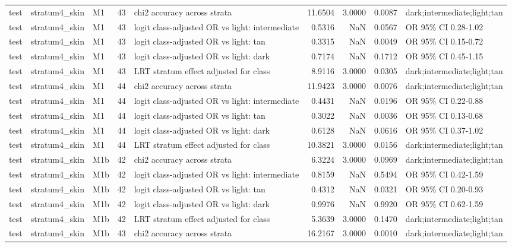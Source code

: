 \begin{tabular}{lllrlrrrl}
test & stratum4\_skin & M1 & 43 & chi2 accuracy across strata & 11.6504 & 3.0000 & 0.0087 & dark;intermediate;light;tan \\
test & stratum4\_skin & M1 & 43 & logit class-adjusted OR vs light: intermediate & 0.5316 & NaN & 0.0567 & OR 95\% CI 0.28-1.02 \\
test & stratum4\_skin & M1 & 43 & logit class-adjusted OR vs light: tan & 0.3315 & NaN & 0.0049 & OR 95\% CI 0.15-0.72 \\
test & stratum4\_skin & M1 & 43 & logit class-adjusted OR vs light: dark & 0.7174 & NaN & 0.1712 & OR 95\% CI 0.45-1.15 \\
test & stratum4\_skin & M1 & 43 & LRT stratum effect adjusted for class & 8.9116 & 3.0000 & 0.0305 & dark;intermediate;light;tan \\
test & stratum4\_skin & M1 & 44 & chi2 accuracy across strata & 11.9423 & 3.0000 & 0.0076 & dark;intermediate;light;tan \\
test & stratum4\_skin & M1 & 44 & logit class-adjusted OR vs light: intermediate & 0.4431 & NaN & 0.0196 & OR 95\% CI 0.22-0.88 \\
test & stratum4\_skin & M1 & 44 & logit class-adjusted OR vs light: tan & 0.3022 & NaN & 0.0036 & OR 95\% CI 0.13-0.68 \\
test & stratum4\_skin & M1 & 44 & logit class-adjusted OR vs light: dark & 0.6128 & NaN & 0.0616 & OR 95\% CI 0.37-1.02 \\
test & stratum4\_skin & M1 & 44 & LRT stratum effect adjusted for class & 10.3821 & 3.0000 & 0.0156 & dark;intermediate;light;tan \\
test & stratum4\_skin & M1b & 42 & chi2 accuracy across strata & 6.3224 & 3.0000 & 0.0969 & dark;intermediate;light;tan \\
test & stratum4\_skin & M1b & 42 & logit class-adjusted OR vs light: intermediate & 0.8159 & NaN & 0.5494 & OR 95\% CI 0.42-1.59 \\
test & stratum4\_skin & M1b & 42 & logit class-adjusted OR vs light: tan & 0.4312 & NaN & 0.0321 & OR 95\% CI 0.20-0.93 \\
test & stratum4\_skin & M1b & 42 & logit class-adjusted OR vs light: dark & 0.9976 & NaN & 0.9920 & OR 95\% CI 0.62-1.59 \\
test & stratum4\_skin & M1b & 42 & LRT stratum effect adjusted for class & 5.3639 & 3.0000 & 0.1470 & dark;intermediate;light;tan \\
test & stratum4\_skin & M1b & 43 & chi2 accuracy across strata & 16.2167 & 3.0000 & 0.0010 & dark;intermediate;light;tan \\

\end{tabular}
